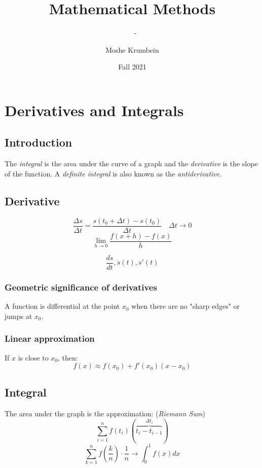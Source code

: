 \documentclass[00_complete]{subfiles}
\title{Mathematical Methods}
\author{Moshe Krumbein}
\date{Fall 2021}
\begin{document}
\setcounter{chapter}{4}


\chapter{Derivatives and Integrals}
\subtitle{\theauthor~ - \thedate}

\section{Introduction}

The \emph{integral} is the area under the curve of a graph and the
\emph{derivative} is the slope of the function. A \emph{definite integral} is
also known as the \emph{antiderivative}.

\section{Derivative}

\begin{definition}[Derivative]
\[
    \frac{\Delta s}{\Delta t} = \frac{s(t_0+\Delta t)-s(t_0)}{\Delta t}
    \quad \Delta t \to 0
\]
$$\lim\limits_{h \to 0} \frac{f(x+h)-f(x)}{h}$$
\end{definition}


\begin{symbols}[Derivative]
    $$\frac{ds}{dt}, \dot s(t), s'(t)$$
\end{symbols}

\subsection{Geometric significance of derivatives}

A function is differential at the point $x_0$ when there are no "sharp edges"
or jumps at $x_0$.

\subsection{Linear approximation}

If $x$ is close to $x_0$, then:
$$f(x) \approx f(x_0)+f'(x_0)(x-x_0)$$

\section{Integral}

The area under the graph is the approximation: (\emph{Riemann Sum})
$$\sum_{i=1}^{n}f(t_i)(\overbrace{t_i-t_{i-1}}^{\Delta t_i})$$
$$\sum_{k=1}^{n}f\left(\frac{k}{n}\right)\cdot \frac{1}{n} \to
\int_{0}^{1}f(x)dx$$
\end{document}
